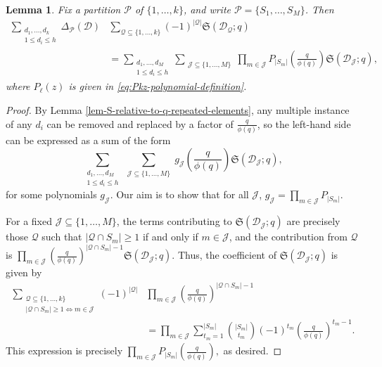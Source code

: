 \documentclass[11pt,letterpaper]{amsart}
\newtheorem{lemma}{Lemma}
\theoremstyle{definition}
\begin{document}
\begin{lemma}\label{lem:partitions-to-polynomial-coefficients-S}
Fix a partition $\mathcal P$ of $\{1, \dots, k\}$, and write $\mathcal P = \{S_1, \dots, S_M\}$. Then
\begin{align*}
\sum_{\substack{d_1, \dots, d_k \\ 1\le d_i \le h }}\Delta_{\mathcal{P}}(\mathcal{D}) &\sum_{\mathcal Q\subseteq \{1,\ldots,k\}} (-1)^{|\mathcal Q|} \mathfrak S(\mathcal{D}_{\mathcal Q};q) \\
&= \sum_{\substack{d_1, \dots, d_M \\ 1 \le d_i \le h}} \sum_{\substack{\mathcal J \subseteq \{1, \dots, M\}}}\prod_{m \in \mathcal J} P_{|S_m|}\left(\frac{q}{\phi(q)}\right) \mathfrak S(\mathcal{D}_{\mathcal J};q),
\end{align*}
where $P_\ell(z)$ is given in \eqref{eq:Pkz-polynomial-definition}.
\end{lemma}
\begin{proof}
By Lemma \ref{lem-S-relative-to-q-repeated-elements}, any multiple instance of any $d_i$ can be removed and replaced by a factor of $\frac{q}{\phi(q)}$, so the left-hand side can be expressed as a sum of the form
\begin{equation*}
\sum_{\substack{d_1, \dots, d_M \\ 1 \le d_i \le h}} \sum_{\substack{\mathcal J \subseteq \{1, \dots, M\}}} g_{\mathcal J}\left(\frac{q}{\phi(q)}\right) \mathfrak S(\mathcal{D}_{\mathcal J};q),
\end{equation*}
for some polynomials $g_{\mathcal J}$. Our aim is to show that for all $\mathcal J$, $g_{\mathcal J} = \prod_{m \in \mathcal J} P_{|S_m|}$. 

For a fixed $\mathcal J \subseteq \{1, \dots, M\}$, the terms contributing to $\mathfrak S(\mathcal{D}_{\mathcal J};q)$ are precisely those $\mathcal Q$ such that $|\mathcal Q \cap S_m| \ge 1$ if and only if $m \in \mathcal J$, and the contribution from $\mathcal Q$ is $\prod_{m \in \mathcal J} \left(\frac{q}{\phi(q)}\right)^{|\mathcal Q \cap S_m|-1} \mathfrak S(\mathcal{D}_{ \mathcal J};q)$. Thus, the coefficient of $\mathfrak S(\mathcal{D}_{\mathcal J};q)$ is given by
\begin{align*}
\sum_{\substack{\mathcal Q \subseteq \{1,\ldots,k\} \\ |\mathcal{Q}\cap S_m| \ge 1 \Leftrightarrow m \in \mathcal J }} (-1)^{|\mathcal Q|}&\prod_{m \in \mathcal J} \left(\frac{q}{\phi(q)}\right)^{|\mathcal Q \cap S_m|-1} \\
&= \prod_{m \in \mathcal J} \sum_{t_m = 1}^{|S_m|} \binom{|S_m|}{t_m}(-1)^{t_m} \left(\frac{q}{\phi(q)}\right)^{t_m-1}.
\end{align*}
This expression is precisely $\prod_{m \in \mathcal J} P_{|S_m|}\left(\frac{q}{\phi(q)}\right),$ as desired.
\end{proof}
\end{document}
